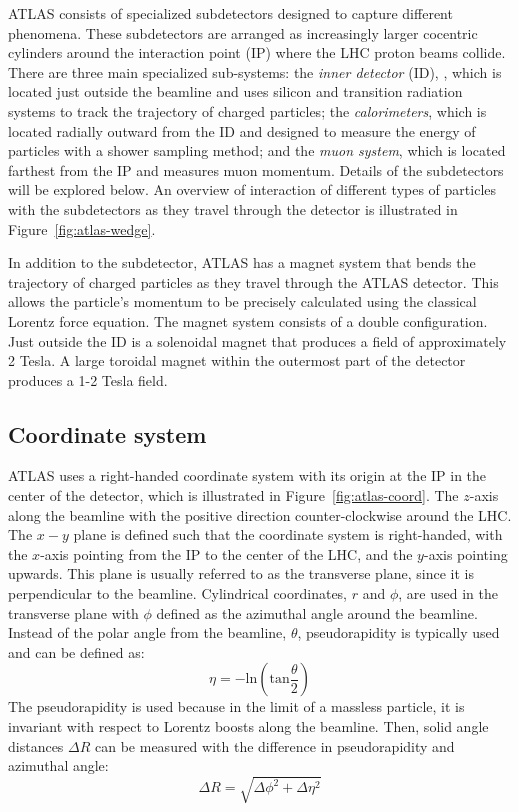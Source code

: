 ATLAS consists of specialized subdetectors designed to capture different phenomena. These subdetectors are arranged as increasingly larger cocentric cylinders around the interaction point (IP) where the LHC proton beams collide. There are three main specialized sub-systems: the \emph{inner detector} (ID),
, which is located just outside the beamline and uses silicon and transition radiation systems to track the trajectory of charged particles; the \emph{calorimeters}, which is located radially outward from the ID and designed to measure the energy of particles with a shower sampling method; and the \emph{muon system}, which is located farthest from the IP and measures muon momentum. Details of the subdetectors will be explored below. An overview of interaction of different types of particles with the subdetectors as they travel through the detector is illustrated in Figure~\ref{fig:atlas-wedge}.

In addition to the subdetector, ATLAS has a magnet system that bends the trajectory of charged particles as  they travel through the ATLAS detector. This allows the particle's momentum to be precisely calculated using the classical Lorentz force equation. The magnet system consists of a double configuration. Just outside the ID is a solenoidal magnet that produces a field of approximately 2 Tesla. A large toroidal magnet within the outermost part of the detector produces a 1-2 Tesla field.


\subsection{Coordinate system}


ATLAS uses a right-handed coordinate system with its origin at the IP in the center of the detector, which is illustrated in Figure~\ref{fig:atlas-coord}. The $z$-axis along the beamline with the positive direction counter-clockwise around the LHC. The $x-y$ plane is defined such that the coordinate system is right-handed, with the $x$-axis pointing from the IP to the center of the LHC, and the $y$-axis pointing upwards. This plane is usually referred to as the transverse plane, since it is perpendicular to the beamline. Cylindrical coordinates, $r$ and $\phi$, are used in the transverse plane with $\phi$ defined as the azimuthal angle around the beamline. Instead of the polar angle from the beamline, $\theta$, pseudorapidity is typically used and can be defined as:
\begin{equation}
\eta = -\text{ln}(\text{tan}\frac{\theta}{2})
\label{eq:eta}
\end{equation}
The pseudorapidity is used because in the limit of a massless particle, it is invariant with respect to Lorentz boosts along the beamline. Then, solid angle distances $\Delta R$ can be measured with the difference in pseudorapidity and azimuthal angle:
\begin{equation}
\Delta R = \sqrt{\Delta \phi^2 + \Delta \eta^2}
\label{eq:dR}
\end{equation}

